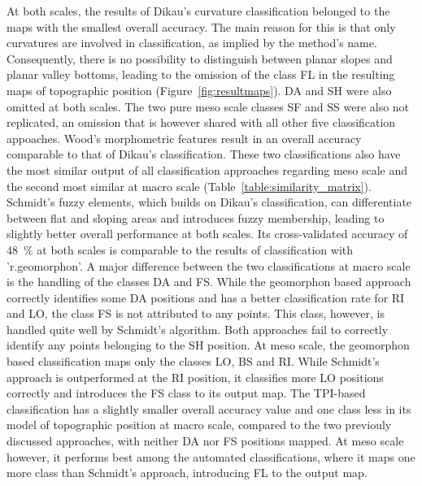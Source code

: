 \documentclass[preprint,12pt,authoryear]{elsarticle}
\begin{document}
At both scales, the results of Dikau's curvature classification belonged to the maps with the smallest overall accuracy. The main reason for this is that only curvatures are involved in classification, as implied by the method's name. Consequently, there is no possibility to distinguish between planar slopes and planar valley bottoms, leading to the omission of the class FL in the resulting maps of topographic position (Figure~\ref{fig:resultmaps}). DA and SH were also omitted at both scales. The two pure meso scale classes SF and SS were also not replicated, an omission that is however shared with all other five classification appoaches. Wood's morphometric features result in an overall accuracy comparable to that of Dikau's classification. These two classifications also have the most similar output of all classification approaches regarding meso scale and the second most similar at macro scale (Table~\ref{table:similarity_matrix}). Schmidt's fuzzy elements, which builds on Dikau's classification, can differentiate between flat and sloping areas and introduces fuzzy membership, leading to slightly better overall performance at both scales. Its cross-validated accuracy of 48~\% at both scales is comparable to the results of classification with 'r.geomorphon'.  A major difference between the two classifications at macro scale is the handling of the classes DA and FS. While the geomorphon based approach correctly identifies some DA positions and has a better classification rate for RI and LO, the class FS is not attributed to any points. This class, however, is handled quite well by Schmidt's algorithm. Both approaches fail to correctly identify any points belonging to the SH position. At meso scale, the geomorphon based classification maps only the classes LO, BS and RI. While Schmidt's approach is outperformed at the RI position, it classifies more LO positions correctly and introduces the FS class to its output map. The TPI-based classification has a slightly smaller overall accuracy value and one class less in its model of topographic position at macro scale, compared to the two previouly discussed approaches, with neither DA nor FS positions mapped. At meso scale however, it performs best among the automated classifications, where it maps one more class than Schmidt's approach, introducing FL to the output map. 
\end{document}
